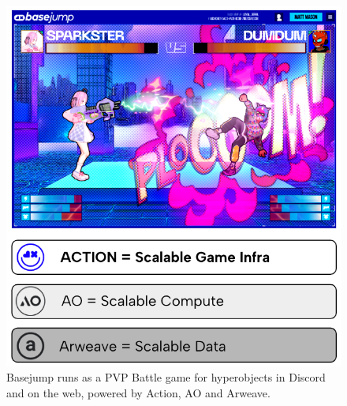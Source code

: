 \begin{figure}[t]
\centering
\includegraphics[width=\columnwidth]{images/image11.png}
\caption{Basejump runs as a PVP Battle game for hyperobjects in Discord and on the web, powered by Action, AO and Arweave.}
\label{fig:basejump_battle}
\end{figure}

